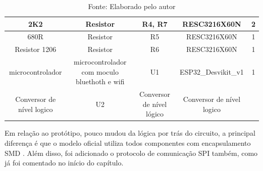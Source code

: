 \documentclass[../delivery_hospital_report.tex]{subfiles}
\begin{document}
\begin{table}[!ht]
\begin{adjustbox}{width=\columnwidth,center}
\begin{tabular}{|c|c|c|c|c|}
2K2                       & Resistor                                     & R4, R7                    & RESC3216X60N              & 2        \\ \hline
680R                      & Resistor                                     & R5                        & RESC3216X60N              & 1        \\ \hline
Resistor 1206             & Resistor                                     & R6                        & RESC3216X60N              & 1        \\ \hline
microcontrolador          & microcontrolador com moculo bluethoth e wifi & U1                        & ESP32\_Desvikit\_v1       & 1        \\ \hline
Conversor de nível logico & U2                                           & Conversor de nível lógico & Conversor de nível logico &          \\ \hline

\end{tabular}
\end{adjustbox}
\centering
\caption*{Fonte: Elaborado pelo autor}
\label{table:Componentes Utilizados na placa de Sinalização}
\end{table}

Em relação ao protótipo, pouco mudou da lógica por trás do circuito, a principal diferença é que o modelo oficial utiliza todos componentes com encapsulamento SMD \cite{SMD_def}. Além disso, foi adicionado o protocolo de comunicação SPI também, como já foi comentado no início do capítulo.
\end{document}
